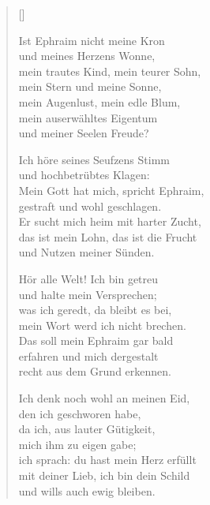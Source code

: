 \begin{multicols}{2}
\settowidth{\versewidth}{Ich höre seines Seufzers Stimm}
\begin{verse}[\versewidth]

 Ist Ephraim nicht meine Kron\\
und meines Herzens Wonne,\\
mein trautes Kind, mein teurer Sohn,\\
mein Stern und meine Sonne,\\
mein Augenlust, mein edle Blum,\\
mein auserwähltes Eigentum\\
und meiner Seelen Freude?

 Ich höre seines Seufzens Stimm\\
und hochbetrübtes Klagen:\\
Mein Gott hat mich, spricht Ephraim,\\
gestraft und wohl geschlagen.\\
Er sucht mich heim mit harter Zucht,\\
das ist mein Lohn, das ist die Frucht\\
und Nutzen meiner Sünden.

 Hör alle Welt! Ich bin getreu\\
und halte mein Versprechen;\\
was ich geredt, da bleibt es bei,\\
mein Wort werd ich nicht brechen.\\
Das soll mein Ephraim gar bald\\
erfahren und mich dergestalt\\
recht aus dem Grund erkennen.

 Ich denk noch wohl an meinen Eid,\\
den ich geschworen habe,\\
da ich, aus lauter Gütigkeit,\\
mich ihm zu eigen gabe;\\
ich sprach: du hast mein Herz erfüllt\\
mit deiner Lieb, ich bin dein Schild\\
und wills auch ewig bleiben.


\end{verse}
\end{multicols}
